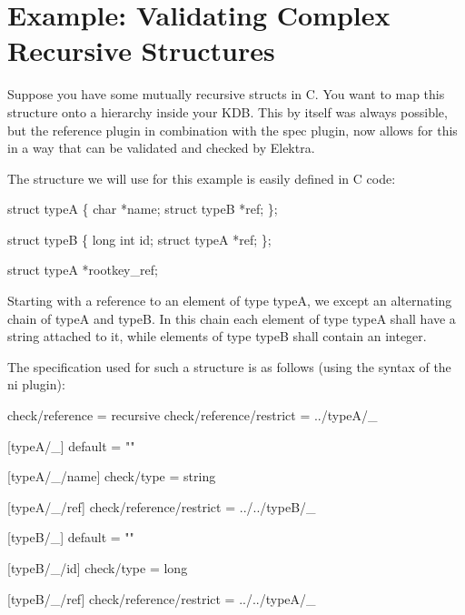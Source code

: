 \hypertarget{md_src_plugins_reference_examples_complex_README_src_plugins_reference_examples_complex_README_md}{}\section{Example\+: Validating Complex Recursive Structures}\label{md_src_plugins_reference_examples_complex_README_src_plugins_reference_examples_complex_README_md}
Suppose you have some mutually recursive {\ttfamily struct}s in C. You want to map this structure onto a hierarchy inside your K\+DB. This by itself was always possible, but the reference plugin in combination with the spec plugin, now allows for this in a way that can be validated and checked by Elektra.

The structure we will use for this example is easily defined in C code\+:


\begin{DoxyCode}
\textcolor{keyword}{struct }typeA \{
  \textcolor{keywordtype}{char} *name;
  \textcolor{keyword}{struct }typeB *ref;
\};

\textcolor{keyword}{struct }typeB \{
  \textcolor{keywordtype}{long} \textcolor{keywordtype}{int} id;
  \textcolor{keyword}{struct }typeA *ref;
\};

\textcolor{keyword}{struct }typeA *rootkey\_ref;
\end{DoxyCode}


Starting with a reference to an element of type {\ttfamily typeA}, we except an alternating chain of {\ttfamily typeA} and {\ttfamily typeB}. In this chain each element of type {\ttfamily typeA} shall have a string attached to it, while elements of type {\ttfamily typeB} shall contain an integer.

The specification used for such a structure is as follows (using the syntax of the {\ttfamily ni} plugin)\+:


\begin{DoxyCode}
check/reference = recursive
check/reference/restrict = ../typeA/\_

[typeA/\_]
default = ""

[typeA/\_/name]
check/type = string

[typeA/\_/ref]
check/reference/restrict = ../../typeB/\_

[typeB/\_]
default = ""

[typeB/\_/id]
check/type = long

[typeB/\_/ref]
check/reference/restrict = ../../typeA/\_
\end{DoxyCode}


